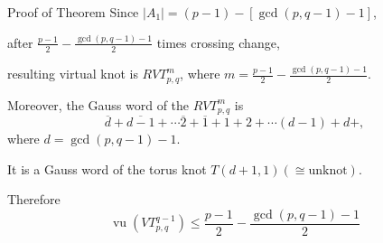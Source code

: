 \documentclass[10pt]{beamer}
\def\vu{\operatorname{vu}}
\def\vt#1#2#3{VT_{#1,#2}^{#3}}
\theoremstyle{definition}
\begin{document}
\begin{frame}[fragile]{Proof of Theorem}
%
Since $|A_1|=(p-1)-[\gcd(p,q-1)-1]$,

after $\frac{p-1}{2} - \frac{\gcd(p,q-1)-1}{2}$ times crossing change,

resulting virtual knot is $RVT_{p,q}^{m}$, where $m=\frac{p-1}{2} - \frac{\gcd(p,q-1)-1}{2}$.


Moreover, the Gauss word of the $RVT_{p,q}^{m}$ is
\[
\overline{d}+\overline{d-1}+\cdots\overline{2}+\overline{1}+1+2+\cdots(d-1)+d+,
\]
where $d=\gcd(p,q-1)-1$.

It is a Gauss word of the torus knot $T(d+1,1)(\cong\text{unknot})$.

Therefore
\[
\vu(\vt{p}{q}{q-1}) \le \frac{p-1}{2} - \frac{\gcd(p,q-1)-1}{2}
\]
\end{frame}


\begin{frame}[fragile]{}
\end{frame}
\end{document}
